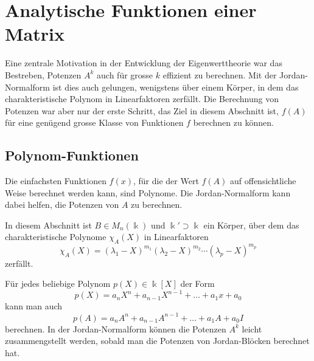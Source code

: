 %
%
%
\section{Analytische Funktionen einer Matrix
\label{buch:section:analytische-funktionen-einer-matrix}}
Eine zentrale Motivation in der Entwicklung der Eigenwerttheorie
war das Bestreben, Potenzen $A^k$ auch für grosse $k$ effizient
zu berechnen.
Mit der Jordan-Normalform ist dies auch gelungen, wenigstens über
einem Körper, in dem das charakteristische Polynom in Linearfaktoren
zerfällt.
Die Berechnung von Potenzen war aber nur der erste Schritt, das Ziel
in diesem Abschnitt ist, $f(A)$ für eine genügend grosse Klasse von
Funktionen $f$ berechnen zu können.

%
%
\subsection{Polynom-Funktionen
\label{buch:subsection:polynom-funktionen}}
Die einfachsten Funktionen $f(x)$, für die der Wert $f(A)$ 
auf offensichtliche Weise berechnet werden kann, sind Polynome.
Die Jordan-Normalform kann dabei helfen, die Potenzen von $A$
zu berechnen.

In diesem Abschnitt ist $B\in M_n(\Bbbk)$ und $\Bbbk'\supset\Bbbk$ ein
Körper, über dem das charakteristische Polynome $\chi_A(X)$ in
Linearfaktoren
\[
\chi_A(X)
=
(\lambda_1-X)^{m_1}(\lambda_2-X)^{m_2}\cdots(\lambda_p-X)^{m_p}
\]
zerfällt.

Für jedes beliebige Polynom $p(X)\in\Bbbk[X]$ der Form
\[
p(X) = a_nX^n + a_{n-1}X^{n-1} + \dots + a_1x + a_0
\]
kann man auch
\[
p(A) = a_nA^n + a_{n-1}A^{n-1} + \dots + a_1A + a_0I
\]
berechnen.
In der Jordan-Normalform können die Potenzen $A^k$ leicht zusammengstellt
werden, sobald man die Potenzen von Jordan-Blöcken berechnet hat.

